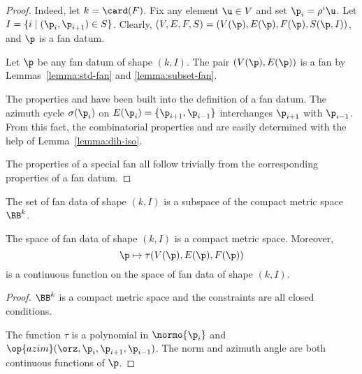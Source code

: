 \begin{proof}
  Indeed, let $k=\card(F)$.  Fix any element $\u\in V$ and
set $\p_i = \rho^i \u$.  Let $I = \{i\mid (\p_i,\p_{i+1}) \in S\}$.
Clearly, $(V,E,F,S)=(V(\p),E(\p),F(\p),S(\p,I))$, and $\p$ is a fan
datum.

Let $\p$ be any fan datum of shape $(k,I)$.  The pair
$(V(\p),E(\p))$
is a fan by Lemmas~\ref{lemma:std-fan} and \ref{lemma:subset-fan}.


 The properties
 and  have been built into the definition of a
fan datum.  The azimuth cycle $\sigma(\p_i)$ on $E(\p_i) =
\{\p_{i+1},\p_{i-1}\}$ interchanges $\p_{i+1}$ with $\p_{i-1}$.  From
this fact, the combinatorial properties  and
 are easily determined with the help of
Lemma~\ref{lemma:dih-iso}.

 The properties
of a special fan all follow trivially from the corresponding
properties of a fan datum.
\end{proof}

The set of fan data of shape $(k,I)$ is a subspace of the compact metric
space $\BB^k$.


\begin{lemma}\label{lemma:compact-fan}
The space of fan data of shape $(k,I)$ is a compact metric space.
Moreover,
\[ 
\p \mapsto \tau(V(\p),E(\p),F(\p))
\] 
is a continuous function on the space of fan data of shape $(k,I)$.
\end{lemma}

\begin{proof} $\BB^k$ is a compact metric space and the constraints
are all closed conditions.

The function $\tau$ is a polynomial in $\normo{\p_i}$ and
$\op{azim}(\orz,\p_i,\p_{i+1},\p_{i-1})$.  The norm and azimuth
angle are both continuous functions of $\p$.
\end{proof}




